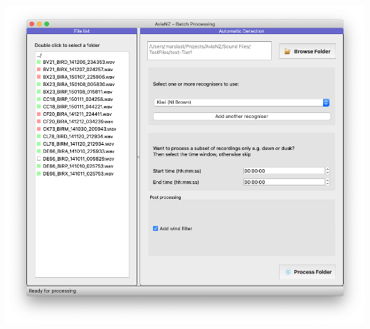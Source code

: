 \documentclass{scrartcl}
\begin{document}
\begin{center}
\includegraphics[width=.95\textwidth]{Figures/BatchProcessing}
\end{center}
\end{document}

